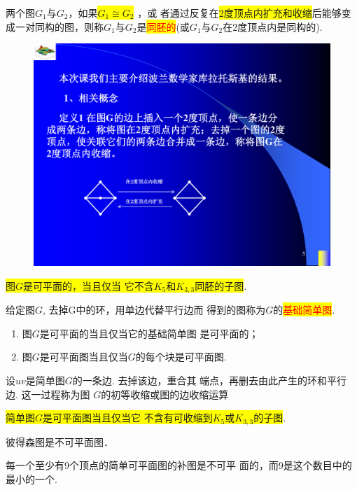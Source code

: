 \begin{definition}
	两个图$G_1$与$G_2$，如果\colorbox{yellow}{$G_1\cong G_2$} ，或
	者通过反复在\colorbox{yellow}{2度顶点内扩充和收缩}后能够变成一对同构的图，则称$G_1$与$G_2$是\colorbox{yellow}{\textcolor{red}{同胚的}}(或$G_1$与$G_2$在2度顶点内是同构的).
\end{definition}
\begin{figure}[H]
	\small
	\centering 
	\includegraphics[scale=1.0]{image/CH6_tongpei.pdf}  
	\label{figkkjj1ik}  
\end{figure}

\begin{theorem}[库拉托斯基]
\colorbox{yellow}{图$G$是可平面的，当且仅当
它不含$K_5$和$K_{3,3}$同胚的子图}.
\end{theorem}

\begin{definition}
	给定图$G$, 去掉G中的环，用单边代替平行边而
	得到的图称为$G$的\colorbox{yellow}{\textcolor{red}{基础简单图}}.
\end{definition}
\begin{theorem}
	\begin{enumerate}
		\item 图$G$是可平面的当且仅当它的基础简单图
		是可平面的；
		\item 图$G$是可平面图当且仅当$G$的每个块是可平面图.
	\end{enumerate}
\end{theorem}


\begin{definition}
设$uv$是简单图$G$的一条边. 去掉该边，重合其
端点，再删去由此产生的环和平行边. 这一过程称为图
$G$的初等收缩或图的边收缩运算
\end{definition}
\begin{theorem}[瓦格纳]
	\colorbox{yellow}{简单图$G$是可平面图当且仅当它
	不含有可收缩到$K_5\mbox{或}K_{3,3}$的子图}.
\end{theorem}
\begin{note}
	彼得森图是不可平面图．
\end{note}
\begin{theorem}
	每一个至少有9个顶点的简单可平面图的补图是不可平
	面的，而9是这个数目中的最小的一个.
\end{theorem}
